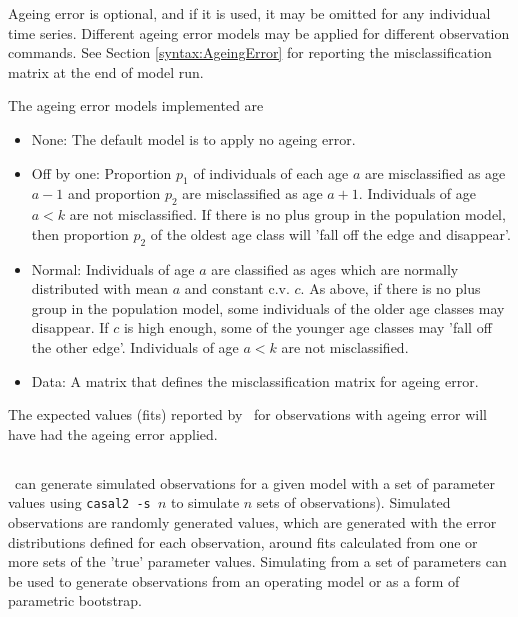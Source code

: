Ageing error is optional, and if it is used, it may be omitted for any individual time series. Different ageing error models may be applied for different observation commands. See Section \ref{syntax:AgeingError} for reporting the misclassification matrix at the end of model run.

The ageing error models implemented are

\begin{itemize}
  \item{None}: The default model is to apply no ageing error.\label{sec:AgeingError-None}
  \item{Off by one}: Proportion $p_1$ of individuals of each age $a$ are misclassified as age $a-1$ and proportion $p_2$ are misclassified as age $a+1$. Individuals of age $a < k$ are not misclassified. If there is no plus group in the population model, then proportion $p_2$ of the oldest age class will 'fall off the edge and disappear'.\label{sec:AgeingError-OffByOne}
  \item{Normal}: Individuals of age $a$ are classified as ages which are normally distributed with mean $a$ and constant c.v. $c$. As above, if there is no plus group in the population model, some individuals of the older age classes may disappear. If $c$ is high enough, some of the younger age classes may 'fall off the other edge'. Individuals of age $a < k$ are not misclassified.\label{sec:AgeingError-Normal}
  \item{Data}: A matrix that defines the misclassification matrix for ageing error\label{sec:AgeingError-Data}.
\end{itemize}

The expected values (fits) reported by \CNAME\ for observations with ageing error will have had the ageing error applied.

\subsection{}\label{sec:Simulate}

\CNAME\ can generate simulated observations for a given model with a set of parameter values using \texttt{casal2 -s $n$} to simulate $n$ sets of observations). Simulated observations are randomly generated values, which are generated with the error distributions defined for each observation, around fits calculated from one or more sets of the 'true' parameter values. Simulating from a set of parameters can be used to generate observations from an operating model or as a form of parametric bootstrap. 


